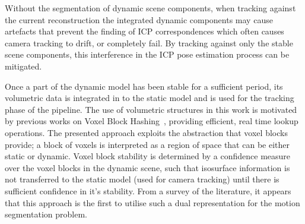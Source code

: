 Without the segmentation of dynamic scene components, when tracking against the
current reconstruction the integrated dynamic components may cause artefacts
that prevent the finding of ICP correspondences which often causes camera
tracking to drift, or completely fail. By tracking against only the stable
scene components, this interference in the ICP pose estimation process can be
mitigated.

Once a part of the dynamic model has been stable for a sufficient period, its
volumetric data is integrated in to the static model and is used for the
tracking phase of the pipeline. The use of volumetric structures in this work
is motivated by previous works on Voxel Block Hashing~\cite{NieBner2013},
providing efficient, real time lookup operations. The presented approach
exploits the abstraction that voxel blocks provide; a block of voxels is
interpreted as a region of space that can be either static or dynamic.
Voxel block stability is determined by a confidence measure over the voxel
blocks in the dynamic scene, such that isosurface information is not transferred
to the static model (used for camera tracking) until there is sufficient
confidence in it's stability. From a survey of the literature, it appears that 
this approach is the first to utilise such a dual representation for the motion 
segmentation problem.

